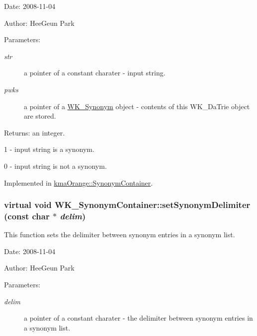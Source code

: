 \begin{Desc}
\item[Date:]2008-11-04 \end{Desc}
\begin{Desc}
\item[Author:]HeeGeun Park \end{Desc}
\begin{Desc}
\item[Parameters:]
\begin{description}
\item[{\em str}]a pointer of a constant charater - input string. \item[{\em pwks}]a pointer of a \hyperlink{classWK__Synonym}{WK\_\-Synonym} object - contents of this WK\_\-DaTrie object are stored. \end{description}
\end{Desc}
\begin{Desc}
\item[Returns:]an integer.\par
 1 - input string is a synonym.\par
 0 - input string is not a synonym. \end{Desc}


Implemented in \hyperlink{classkmaOrange_1_1SynonymContainer_d17697e0744a34ea4d9ffe782e981cc4}{kmaOrange::SynonymContainer}.\hypertarget{classWK__SynonymContainer_7a2c0a7a7da0d37c1be8816b1c20c680}{
\subsubsection[{setSynonymDelimiter}]{\setlength{\rightskip}{0pt plus 5cm}virtual void WK\_\-SynonymContainer::setSynonymDelimiter (const char $\ast$ {\em delim})}}
\label{classWK__SynonymContainer_7a2c0a7a7da0d37c1be8816b1c20c680}


This function sets the delimiter between synonym entries in a synonym list. 

\begin{Desc}
\item[Date:]2008-11-04 \end{Desc}
\begin{Desc}
\item[Author:]HeeGeun Park \end{Desc}
\begin{Desc}
\item[Parameters:]
\begin{description}
\item[{\em delim}]a pointer of a constant charater - the delimiter between synonym entries in a synonym list. \end{description}
\end{Desc}


